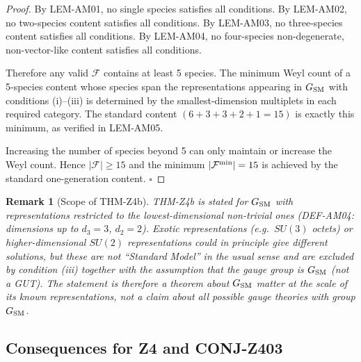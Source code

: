 \documentclass[12pt, a4paper]{article}
\newtheorem{remark}{Remark}[section]
\begin{document}
\begin{proof}
By LEM-AM01, no single species satisfies all conditions.
By LEM-AM02, no two-species content satisfies all conditions.
By LEM-AM03, no three-species content satisfies all conditions.
By LEM-AM04, no four-species non-degenerate, non-vector-like
content satisfies all conditions.

Therefore any valid $\mathcal{F}$ contains at least 5 species.
The minimum Weyl count of a 5-species content whose species span
the representations appearing in $G_{\rm SM}$ with conditions
(i)--(iii) is determined by the smallest-dimension multiplets in
each required category. The standard content $(6+3+3+2+1 = 15)$
is exactly this minimum, as verified in LEM-AM05.

Increasing the number of species beyond 5 can only maintain or
increase the Weyl count. Hence $|\mathcal{F}| \geq 15$ and the
minimum $|\mathcal{F}^{\rm min}| = 15$ is achieved by the standard
one-generation content. \hfill$\square$
\end{proof}

\begin{remark}[Scope of THM-Z4b]
THM-Z4b is stated for $G_{\rm SM}$ with representations restricted
to the lowest-dimensional non-trivial ones (DEF-AM04: dimensions
up to $d_3 = 3$, $d_2 = 2$). Exotic representations (e.g.\
$SU(3)$ octets) or higher-dimensional $SU(2)$ representations
could in principle give different solutions, but these are not
``Standard Model'' in the usual sense and are excluded by condition
(iii) together with the assumption that the gauge group is
$G_{\rm SM}$ (not a GUT). The statement is therefore a theorem about
$G_{\rm SM}$ matter at the scale of its known representations, not
a claim about all possible gauge theories with group $G_{\rm SM}$.
\end{remark}

\subsection{Consequences for Z4 and CONJ-Z403}
\label{sec:consequences}
\end{document}
